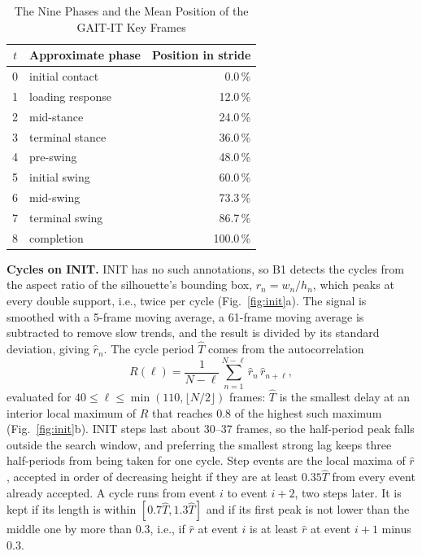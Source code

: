 \documentclass[conference]{IEEEtran}
\begin{document}
\begin{table}[t]
\centering
\caption{The Nine Phases and the Mean Position of the GAIT-IT Key Frames}
\label{tab:phases}
\begin{tabular}{clr}
\toprule
$t$ & Approximate phase & Position in stride \\
\midrule
0 & initial contact & 0.0\,\% \\
1 & loading response & 12.0\,\% \\
2 & mid-stance & 24.0\,\% \\
3 & terminal stance & 36.0\,\% \\
4 & pre-swing & 48.0\,\% \\
5 & initial swing & 60.0\,\% \\
6 & mid-swing & 73.3\,\% \\
7 & terminal swing & 86.7\,\% \\
8 & completion & 100.0\,\% \\
\bottomrule
\end{tabular}
\end{table}

\textbf{Cycles on INIT.} INIT has no such annotations, so B1 detects the cycles from the aspect ratio of the silhouette's bounding box, $r_n=w_n/h_n$, which peaks at every double support, i.e., twice per cycle (Fig.~\ref{fig:init}a). The signal is smoothed with a 5-frame moving average, a 61-frame moving average is subtracted to remove slow trends, and the result is divided by its standard deviation, giving $\hat{r}_n$. The cycle period $\hat{T}$ comes from the autocorrelation
\begin{equation}
R(\ell)=\frac{1}{N-\ell}\sum_{n=1}^{N-\ell}\hat{r}_n\,\hat{r}_{n+\ell},
\label{eq:acf}
\end{equation}
evaluated for $40\le\ell\le\min(110,\lfloor N/2\rfloor)$ frames: $\hat{T}$ is the smallest delay at an interior local maximum of $R$ that reaches 0.8 of the highest such maximum (Fig.~\ref{fig:init}b). INIT steps last about 30--37 frames, so the half-period peak falls outside the search window, and preferring the smallest strong lag keeps three half-periods from being taken for one cycle. Step events are the local maxima of $\hat{r}$, accepted in order of decreasing height if they are at least $0.35\hat{T}$ from every event already accepted. A cycle runs from event $i$ to event $i+2$, two steps later. It is kept if its length is within $[0.7\hat{T},1.3\hat{T}]$ and if its first peak is not lower than the middle one by more than 0.3, i.e., if $\hat{r}$ at event $i$ is at least $\hat{r}$ at event $i+1$ minus 0.3.
\end{document}
